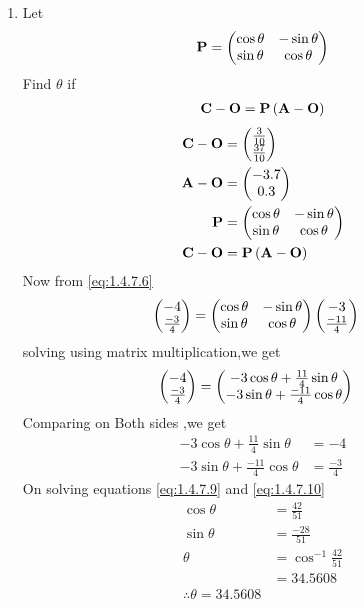 \documentclass[11pt]{book}
\begin{document}
\begin{enumerate}[label=\thesection.\arabic*.,ref=\thesection.\theenumi]
\item Let 
\begin{align}
\mathbf{P} = \begin{pmatrix}\cos \theta & -\sin \theta \\ \sin \theta & \cos \theta\end{pmatrix}
\end{align}
Find $\theta$ if 
\begin{align}
\mathbf{C}-\mathbf{O}=\mathbf{P}\left(\mathbf{A}-\mathbf{O}\right)
\end{align}
\solution
\begin{align}
    \vec{C}-\vec{O}
          & =\myvec{\frac{3}{10}\\\frac{37}{10}}\\
\vec{A}-\vec{O}
         & =\myvec{-3.7\\\-0.3}
	  \\
\vec{P} &= \myvec{\cos \theta & -\sin \theta \\ \sin \theta & \cos \theta} \\
   \vec{C}-\vec{O}&=\vec{P}\brak{\vec{A}-\vec{O}} \label{eq:1.4.7.6}
\end{align}
 Now from \eqref{eq:1.4.7.6}
 \begin{align}
 \begin{pmatrix}-4\\\frac{-3}{4}\end{pmatrix}&= \begin{pmatrix}\cos \theta & -\sin \theta \\ \sin \theta & \cos \theta\end{pmatrix} \begin{pmatrix}-3\\\frac{-11}{4}\end{pmatrix}    
 \end{align}
solving using matrix multiplication,we get
\begin{align}
    \begin{pmatrix}-4\\\frac{-3}{4}\end{pmatrix}&=\begin{pmatrix} -3\cos\theta + \frac{11}{4}\sin\theta \\ -3\sin\theta + \frac{-11}{4}\cos\theta\end{pmatrix}
\end{align}
Comparing on Both sides ,we get
\begin{align}
     -3\cos\theta + \frac{11}{4}\sin\theta &= -4   \label{eq:1.4.7.9}\\
 -3\sin\theta + \frac{-11}{4}\cos\theta &= \frac{-3}{4} \label{eq:1.4.7.10}
\end{align}
On solving equations \eqref{eq:1.4.7.9}  and \eqref{eq:1.4.7.10}
\begin{align}
    \cos\theta&= \frac{42}{51} \\
    \sin\theta&= \frac{-28}{51} \\
    \theta &=\cos^{-1}\frac{42}{51} \\
            &= 34.5608\\
            \therefore \theta = 34.5608
\end{align}
\end{enumerate}
\end{document}
